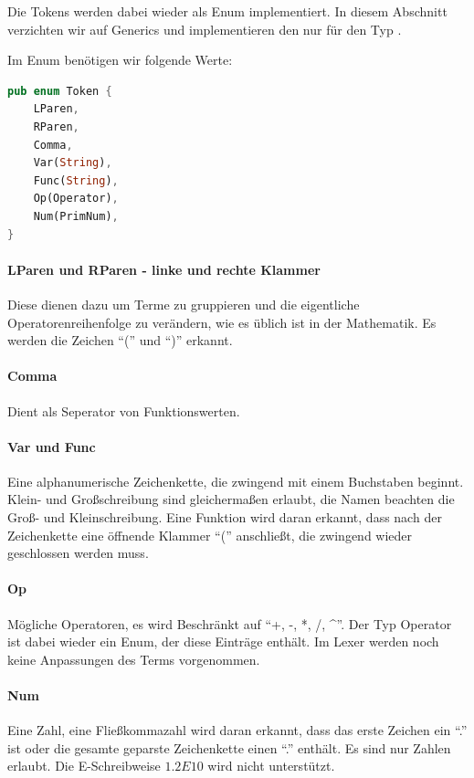 \documentclass[11pt,a4paper, ngerman]{article}
\begin{document}
Die Tokens werden dabei wieder als Enum implementiert. In diesem Abschnitt verzichten wir auf Generics und implementieren den  nur für den Typ .

Im Enum benötigen wir folgende Werte:
\begin{lstlisting}[language=rust, caption={Enum Token}]
pub enum Token {
    LParen,
    RParen,
    Comma,
    Var(String),
    Func(String),
    Op(Operator),
    Num(PrimNum),
}
\end{lstlisting}

\paragraph{LParen und RParen - linke und rechte Klammer} Diese dienen dazu um Terme zu gruppieren und die eigentliche Operatorenreihenfolge zu verändern, wie es üblich ist in der Mathematik. Es werden die Zeichen ``('' und ``)'' erkannt.

\paragraph{Comma} Dient als Seperator von Funktionswerten.

\paragraph{Var und Func} Eine alphanumerische Zeichenkette, die zwingend mit einem Buchstaben beginnt. Klein- und Großschreibung sind gleichermaßen erlaubt, die Namen beachten die Groß- und Kleinschreibung. Eine Funktion wird daran erkannt, dass nach der Zeichenkette eine öffnende Klammer ``('' anschließt, die zwingend wieder geschlossen werden muss.

\paragraph{Op} Mögliche Operatoren, es wird Beschränkt auf ``+, -, *, /, \^{}''. Der Typ Operator ist dabei wieder ein Enum, der diese Einträge enthält. Im Lexer werden noch keine Anpassungen des Terms vorgenommen.

\paragraph{Num} Eine Zahl, eine Fließkommazahl wird daran erkannt, dass das erste Zeichen ein ``.'' ist oder die gesamte geparste Zeichenkette einen ``.'' enthält. Es sind nur Zahlen erlaubt. Die E-Schreibweise $1.2E10$ wird nicht unterstützt.
\end{document}
